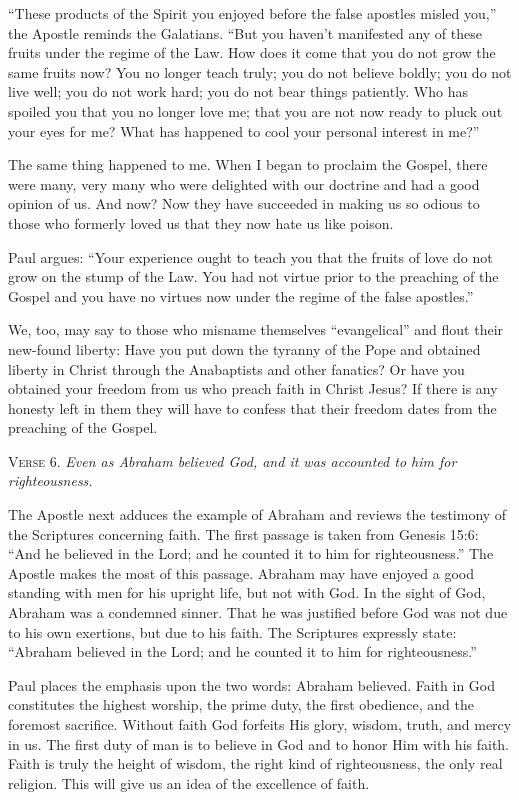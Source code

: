 “These products of the Spirit you enjoyed before the false apostles misled you,” the Apostle reminds the Galatians. “But you haven’t manifested any of these fruits under the regime of the Law. How does it come that you do not grow the same fruits now? You no longer teach truly; you do not believe boldly; you do not live well; you do not work hard; you do not bear things patiently. Who has spoiled you that you no longer love me; that you are not now ready to pluck out your eyes for me? What has happened to cool your personal interest in me?”

The same thing happened to me. When I began to proclaim the Gospel, there were many, very many who were delighted with our doctrine and had a good opinion of us. And now? Now they have succeeded in making us so odious to those who formerly loved us that they now hate us like poison.

Paul argues: “Your experience ought to teach you that the fruits of love do not grow on the stump of the Law. You had not virtue prior to the preaching of the Gospel and you have no virtues now under the regime of the false apostles.”

We, too, may say to those who misname themselves “evangelical” and flout their new-found liberty: Have you put down the tyranny of the Pope and obtained liberty in Christ through the Anabaptists and other fanatics? Or have you obtained your freedom from us who preach faith in Christ Jesus? If there is any honesty left in them they will have to confess that their freedom dates from the preaching of the Gospel.

\textsc{Verse} 6. \emph{Even as Abraham believed God, and it was accounted to him for righteousness.}

The Apostle next adduces the example of Abraham and reviews the testimony of the Scriptures concerning faith. The first passage is taken from Genesis 15:6: “And he believed in the Lord; and he counted it to him for righteousness.” The Apostle makes the most of this passage. Abraham may have enjoyed a good standing with men for his upright life, but not with God. In the sight of God, Abraham was a condemned sinner. That he was justified before God was not due to his own exertions, but due to his faith. The Scriptures expressly state: “Abraham believed in the Lord; and he counted it to him for righteousness.”

Paul places the emphasis upon the two words: Abraham believed. Faith in God constitutes the highest worship, the prime duty, the first obedience, and the foremost sacrifice. Without faith God forfeits His glory, wisdom, truth, and mercy in us. The first duty of man is to believe in God and to honor Him with his faith. Faith is truly the height of wisdom, the right kind of righteousness, the only real religion. This will give us an idea of the excellence of faith.

